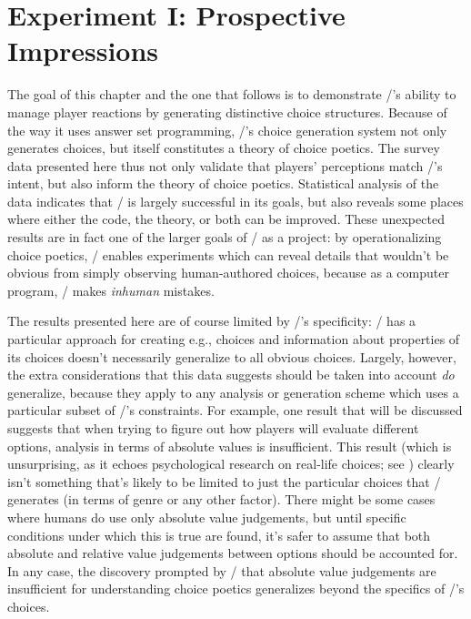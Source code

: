 \chapter{Experiment I: Prospective Impressions}

\label{ch:option-results}


The goal of this chapter and the one that follows is to demonstrate \dunyazad/'s ability to manage player reactions by generating distinctive choice structures.
%
Because of the way it uses answer set programming, \dunyazad/'s choice generation system not only generates choices, but itself constitutes a theory of choice poetics.
%
The survey data presented here thus not only validate that players' perceptions match \dunyazad/'s intent, but also inform the theory of choice poetics.
%
Statistical analysis of the data indicates that \dunyazad/ is largely successful in its goals, but also reveals some places where either the code, the theory, or both can be improved. 
%
These unexpected results are in fact one of the larger goals of \dunyazad/ as a project: by operationalizing choice poetics, \dunyazad/ enables experiments which can reveal details that wouldn't be obvious from simply observing human-authored choices, because as a computer program, \dunyazad/ makes \emph{inhuman} mistakes.


The results presented here are of course limited by \dunyazad/'s specificity: \dunyazad/ has a particular approach for creating e.g.,  choices and information about properties of its  choices doesn't necessarily generalize to all obvious choices.
%
Largely, however, the extra considerations that this data suggests should be taken into account \emph{do} generalize, because they apply to any analysis or generation scheme which uses a particular subset of \dunyazad/'s constraints.
%
For example, one result that will be discussed suggests that when trying to figure out how players will evaluate different options, analysis in terms of absolute values is insufficient.
%
This result (which is unsurprising, as it echoes psychological research on real-life choices; see \citep{Schwartz2002}) clearly isn't something that's likely to be limited to just the particular choices that \dunyazad/ generates (in terms of genre or any other factor).
%
There might be some cases where humans do use only absolute value judgements, but until specific conditions under which this is true are found, it's safer to assume that both absolute and relative value judgements between options should be accounted for.
%
In any case, the discovery prompted by \dunyazad/ that absolute value judgements are insufficient for understanding choice poetics generalizes beyond the specifics of \dunyazad/'s choices.


